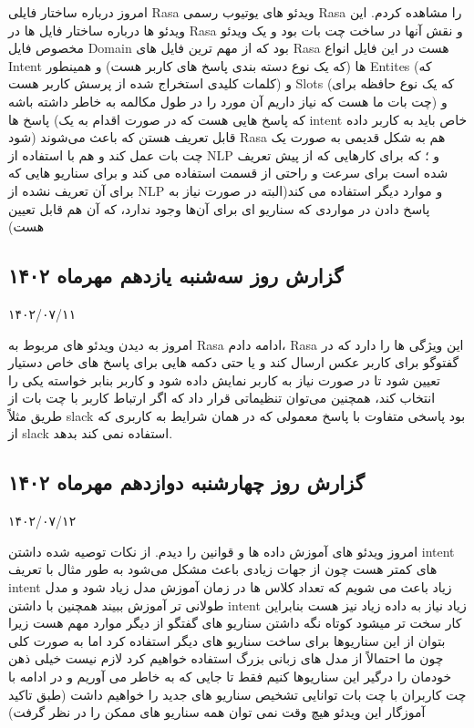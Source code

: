 امروز درباره ساختار فایلی Rasa ویدئو های یوتیوب رسمی Rasa را مشاهده کردم.
این ویدئو ها درباره ساختار فایل ها در Rasa و نقش آنها در ساخت چت بات بود و یک ویدئو مخصوص فایل Domain بود که از مهم ترین فایل های Rasa هست در این فایل انواع Intent ها (که یک نوع دسته بندی پاسخ های کاربر هست) و همینطور Entites (که کلمات کلیدی استخراج شده از پرسش کاربر هست) و Slots (که یک نوع حافظه برای چت بات ما هست که نیاز داریم آن مورد را در طول مکالمه به خاطر داشته باشه) و پاسخ ها (که پاسخ هایی هست که در صورت اقدام به یک intent خاص باید به کاربر داده شود) قابل تعریف هستن که باعث می‌شوند Rasa هم به شکل قدیمی به صورت یک چت بات  عمل کند و هم با استفاده از NLP و ؛ که برای کارهایی که از پیش تعریف شده است برای سرعت و راحتی از قسمت  استفاده می کند و برای سناریو هایی که برای آن تعریف نشده از NLP و موارد دیگر استفاده می کند(البته در صورت نیاز به پاسخ دادن در مواردی که سناریو ای برای آن‌ها وجود ندارد، که آن هم قابل تعیین هست)


\subsection{گزارش روز سه‌شنبه یازدهم مهرماه ۱۴۰۲}

۱۴۰۲/۰۷/۱۱

امروز به دیدن ویدئو های مربوط به Rasa ادامه دادم، Rasa این ویژگی ها را دارد که در گفتوگو برای کاربر عکس ارسال کند و یا حتی دکمه هایی برای پاسخ های خاص دستیار تعیین شود تا در صورت نیاز به کاربر نمایش داده شود و کاربر بنابر خواسته یکی را انتخاب کند، همچنین می‌توان تنظیماتی قرار داد که اگر ارتباط کاربر با چت بات از طریق مثلاً slack بود پاسخی متفاوت با پاسخ معمولی که در همان شرایط به کاربری که از slack استفاده نمی کند بدهد.


\subsection{گزارش روز چهارشنبه دوازدهم مهرماه ۱۴۰۲}

۱۴۰۲/۰۷/۱۲

امروز ویدئو های آموزش داده ها و قوانین را دیدم. از نکات توصیه شده داشتن intent های کمتر هست چون از جهات زیادی باعث مشکل می‌شود به طور مثال با تعریف intent زیاد باعث می شویم که تعداد کلاس ها در زمان آموزش مدل زیاد شود و مدل طولانی تر آموزش ببیند همچنین با داشتن intent زیاد نیاز به داده زیاد نیز هست بنابراین کار سخت تر میشود کوتاه نگه داشتن سناریو های گفتگو از دیگر موارد مهم هست زیرا بتوان از این سناریوها برای ساخت سناریو های دیگر استفاده کرد اما به صورت کلی چون ما احتمالاً از مدل های زبانی بزرگ استفاده خواهیم کرد لازم نیست خیلی ذهن خودمان را درگیر این سناریوها کنیم فقط تا جایی که به خاطر می آوریم و در ادامه با چت کاربران با چت بات توانایی تشخیص سناریو های جدید را خواهیم داشت (طبق تاکید آموزگار این ویدئو هیچ وقت نمی توان همه سناریو های ممکن را در نظر گرفت)


